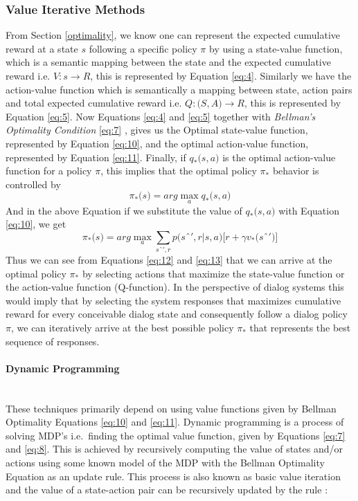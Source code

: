 \documentclass[12pt]{extarticle}
\newcommand{\myparagraph}[1]{\paragraph{#1}\mbox{}\\ \linebreak}
\numberwithin{equation}{section}
\begin{document}
	\subsubsection{Value Iterative Methods}
	From Section \ref{optimality}, we know one can represent the expected cumulative reward at a state $s$ following a specific policy $\pi$ by using a state-value function, which is a semantic mapping between the state and the expected cumulative reward i.e. 
	$V: s \rightarrow R$, this is represented by Equation \ref{eq:4}. Similarly we have the action-value function which is semantically a mapping between state, action pairs and total expected cumulative reward i.e. $Q: \big(S,A\big) \rightarrow R$, this is represented by Equation \ref{eq:5}. Now Equations \ref{eq:4} and \ref{eq:5} together with \textit{Bellman's Optimality Condition} \ref{eq:7} \cite{Sutton-introRL}, gives us the Optimal state-value function, represented by Equation \ref{eq:10}, and the optimal action-value function, represented by Equation \ref{eq:11}. Finally, if $q_*\big(s,a\big)$ is the optimal action-value function for a policy $\pi$, this implies that the optimal policy $\pi_*$ behavior is controlled by
	\begin{equation}
	\pi_*\big(s\big) = arg \max_{a} q_*\big(s,a\big) \label{eq:12}
	\end{equation}
	And in the above Equation if we substitute the value of $q_*\big(s,a\big)$ with Equation \ref{eq:10}, we get 
	\begin{equation}
	\pi_*\big(s\big) = arg \max_{a} \sum_{sˆ',r}{p\big(sˆ',r|s,a\big)}\bigg[r+\gamma v_{*}\big(sˆ'\big)\bigg] \label{eq:13}
	\end{equation}
	Thus we can see from Equations \ref{eq:12} and \ref{eq:13} that we can arrive at the optimal policy $\pi_*$ by selecting actions that maximize the state-value function or the action-value function (Q-function). In the perspective of dialog systems this would imply that by selecting the system responses that maximizes cumulative reward for every conceivable dialog state and consequently follow a dialog policy $\pi$, we can iteratively arrive at the best possible policy $\pi_*$ that represents the best sequence of responses.
	\myparagraph{Dynamic Programming}\label{dp}
	These techniques primarily depend on using value functions given by Bellman Optimality Equations  \ref{eq:10} and \ref{eq:11}. Dynamic programming is a process of solving MDP's i.e.\ finding the optimal value function, given by Equations \ref{eq:7} and \ref{eq:8}. This is achieved by recursively computing the value of states and/or actions using some known model of the MDP with the Bellman Optimality Equation as an update rule. This process is also known as basic value iteration and the value of a state-action pair can be recursively updated by the rule \cite{Sutton-introRL} :
\end{document}
